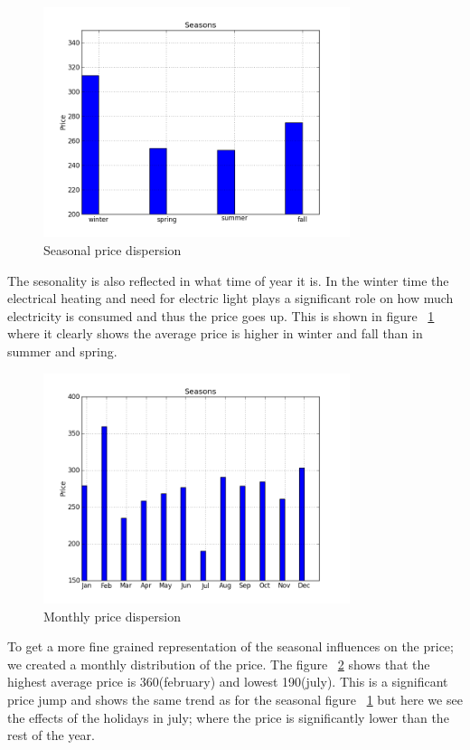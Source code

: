 \begin{figure}[H]
\centering
\includegraphics[width=0.8\textwidth ]{billeder/energy_price_plots/seasons.png}
\caption{Seasonal price dispersion}
\label{fig:seasons}
\end{figure}

The sesonality is also reflected in what time of year it is. In the winter time the electrical heating and need for electric light plays a significant role on how much electricity is consumed and thus the price goes up. This is shown in figure ~\ref{fig:seasons} where it clearly shows the average price is higher in winter and fall than in summer and spring.

\begin{figure}[H]
\centering
\includegraphics[width=0.8\textwidth ]{billeder/energy_price_plots/averageMonthlyPrice.png}
\caption{Monthly price dispersion}
\label{fig:monthlyAveragePrice}
\end{figure}

To get a more fine grained representation of the seasonal influences on the price; we created a monthly distribution of the price. The figure ~\ref{fig:monthlyAveragePrice} shows that the highest average price is 360(february) and lowest 190(july). This is a significant price jump and shows the same trend as for the seasonal figure ~\ref{fig:seasons} but here we see the effects of the holidays in july; where the price is significantly lower than the rest of the year.

